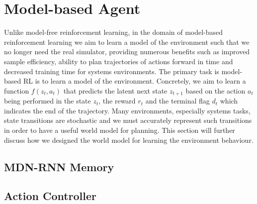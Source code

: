 \section{Model-based Agent}

Unlike model-free reinforcement learning, in the domain of model-based reinforcement learning we aim to learn a model of the environment such that we no longer need the real simulator, providing numerous benefits such as improved sample efficiency, ability to plan trajectories of actions forward in time and decreased training time for systems environments. The primary task is model-based RL is to learn a model of the environment. Concretely, we aim to learn a function $f(z_t, a_t)$ that predicts the latent next state $z_{t+1}$ based on the action $a_t$ being performed in the state $z_t$, the reward $r_t$ and the terminal flag $d_t$ which indicates the end of the trajectory. Many environments, especially systems tasks, state transitions are stochastic and we must accurately represent such transitions in order to have a useful world model for planning. This section will further discuss how we designed the world model for learning the environment behaviour.

\subsection{MDN-RNN Memory}

\subsection{Action Controller}